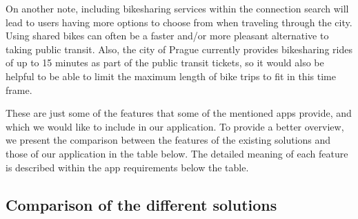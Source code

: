 On another note, including bikesharing services within the connection search will lead to users having more options to choose from when traveling through the city. Using shared bikes can often be a faster and/or more pleasant alternative to taking public transit. Also, the city of Prague currently provides bikesharing rides of up to 15 minutes as part of the public transit tickets, so it would also be helpful to be able to limit the maximum length of bike trips to fit in this time frame.

These are just some of the features that some of the mentioned apps provide, and which we would like to include in our application. To provide a better overview, we present the comparison between the features of the existing solutions and those of our application in the table below. The detailed meaning of each feature is described within the app requirements below the table.

\subsection{Comparison of the different solutions}


